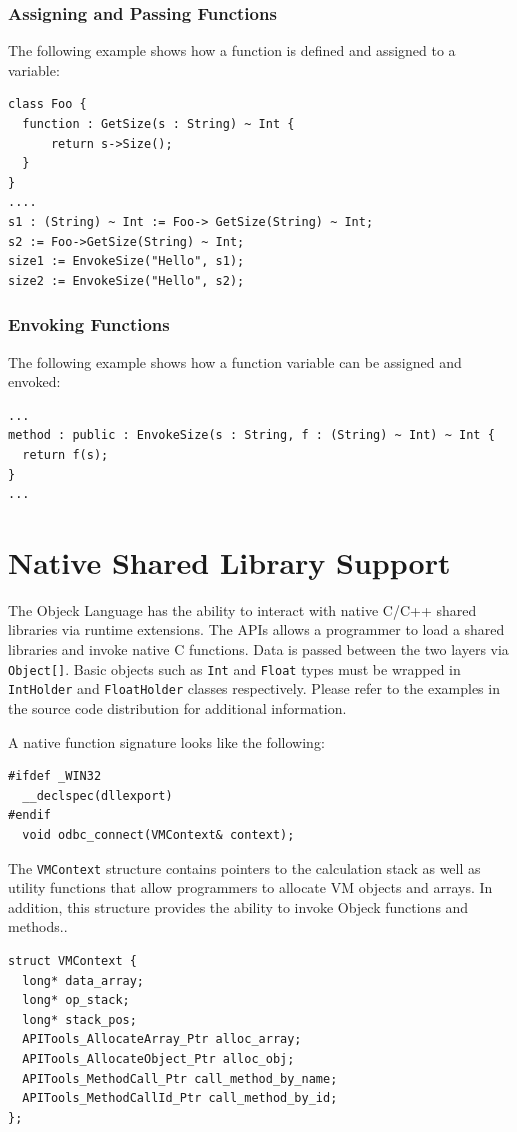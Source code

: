 \documentclass[11pt]{article}
\begin{document}
\subsubsection{Assigning and Passing Functions}
The following example shows how a function is defined and assigned to
a variable:
\begin{verbatim}
class Foo {
  function : GetSize(s : String) ~ Int {
      return s->Size();
  }
}
....
s1 : (String) ~ Int := Foo-> GetSize(String) ~ Int;
s2 := Foo->GetSize(String) ~ Int;
size1 := EnvokeSize("Hello", s1);
size2 := EnvokeSize("Hello", s2);
\end{verbatim}

\subsubsection{Envoking Functions}
The following example shows how a function variable can be assigned
and envoked:
\begin{verbatim}
...
method : public : EnvokeSize(s : String, f : (String) ~ Int) ~ Int {
  return f(s);
}
...
\end{verbatim}

\section{Native Shared Library Support}
The Objeck Language has the ability to interact with native C/C++
shared libraries via runtime extensions.  The APIs allows a programmer
to load a shared libraries and invoke native C functions.  Data is
passed between the two layers via \texttt{Object[]}.  Basic objects
such as \texttt{Int} and \texttt{Float} types must be wrapped in
\texttt{IntHolder} and \texttt{FloatHolder} classes respectively.
Please refer to the examples in the source code distribution for
additional information.

A native function signature looks like the following:
\begin{verbatim}
#ifdef _WIN32
  __declspec(dllexport)
#endif
  void odbc_connect(VMContext& context);
\end{verbatim}

The \texttt{VMContext} structure contains pointers to the calculation
stack as well as utility functions that allow programmers to allocate
VM objects and arrays.  In addition, this structure provides the
ability to invoke Objeck functions and methods..

\begin{verbatim}
struct VMContext {
  long* data_array;
  long* op_stack;
  long* stack_pos;
  APITools_AllocateArray_Ptr alloc_array;
  APITools_AllocateObject_Ptr alloc_obj;
  APITools_MethodCall_Ptr call_method_by_name;
  APITools_MethodCallId_Ptr call_method_by_id;
};
\end{verbatim}
\end{document}
